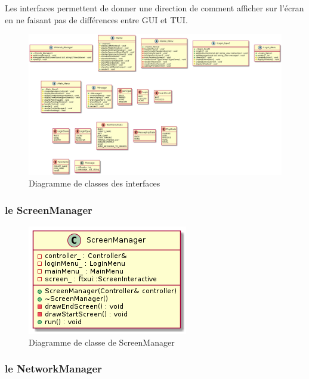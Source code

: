 \documentclass{article}
\begin{document}
Les interfaces permettent de donner une direction de comment afficher sur l'écran en ne faisant pas de différences entre GUI et TUI.

\begin{figure}[H]
    \centering
    \includegraphics[scale=0.3]{../res/uml/class/InterfaceClass.png}
    \caption{Diagramme de classes des interfaces}
    \label{fig:InterfaceDiagram}
\end{figure}

\subsubsection*{le ScreenManager}


\begin{figure}[!ht]
    \centering
    \includegraphics[scale=0.4]{../res/uml/class/ScreenManagerClass.png}
    \caption{Diagramme de classe de ScreenManager}
    \label{fig:ScreenManagerDiagram}
\end{figure}

\subsubsection{le NetworkManager}
\end{document}
